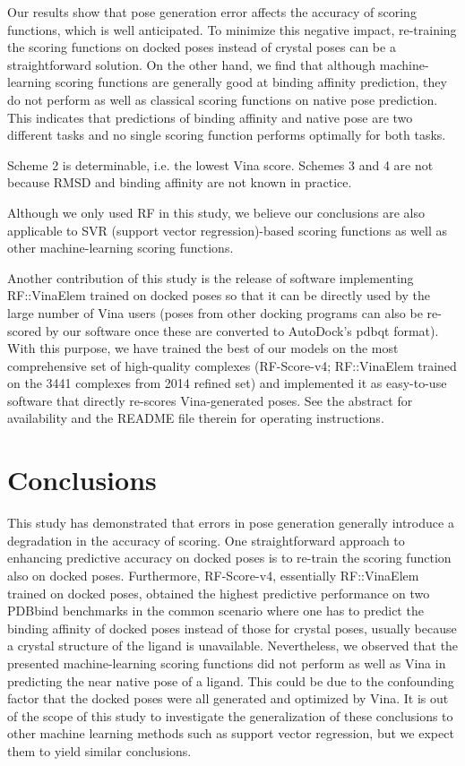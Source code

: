 \documentclass[twocolumn]{bmcart}
\begin{document}
Our results show that pose generation error affects the accuracy of scoring functions, which is well anticipated. To minimize this negative impact, re-training the scoring functions on docked poses instead of crystal poses can be a straightforward solution. On the other hand, we find that although machine-learning scoring functions are generally good at binding affinity prediction, they do not perform as well as classical scoring functions on native pose prediction. This indicates that predictions of binding affinity and native pose are two different tasks and no single scoring function performs optimally for both tasks.

Scheme 2 is determinable, i.e. the lowest Vina score. Schemes 3 and 4 are not because RMSD and binding affinity are not known in practice.

Although we only used RF in this study, we believe our conclusions are also applicable to SVR (support vector regression)-based scoring functions \cite{1295,963} as well as other machine-learning scoring functions.

Another contribution of this study is the release of software implementing RF::VinaElem trained on docked poses so that it can be directly used by the large number of Vina users (poses from other docking programs can also be re-scored by our software once these are converted to AutoDock’s pdbqt format). With this purpose, we have trained the best of our models on the most comprehensive set of high-quality complexes (RF-Score-v4; RF::VinaElem trained on the 3441 complexes from 2014 refined set) and implemented it as easy-to-use software that directly re-scores Vina-generated poses. See the abstract for availability and the README file therein for operating instructions.

\section*{Conclusions}

This study has demonstrated that errors in pose generation generally introduce a degradation in the accuracy of scoring. One straightforward approach to enhancing predictive accuracy on docked poses is to re-train the scoring function also on docked poses. Furthermore, RF-Score-v4, essentially RF::VinaElem trained on docked poses, obtained the highest predictive performance on two PDBbind benchmarks in the common scenario where one has to predict the binding affinity of docked poses instead of those for crystal poses, usually because a crystal structure of the ligand is unavailable. Nevertheless, we observed that the presented machine-learning scoring functions did not perform as well as Vina in predicting the near native pose of a ligand. This could be due to the confounding factor that the docked poses were all generated and optimized by Vina. It is out of the scope of this study to investigate the generalization of these conclusions to other machine learning methods such as support vector regression, but we expect them to yield similar conclusions.
\end{document}

